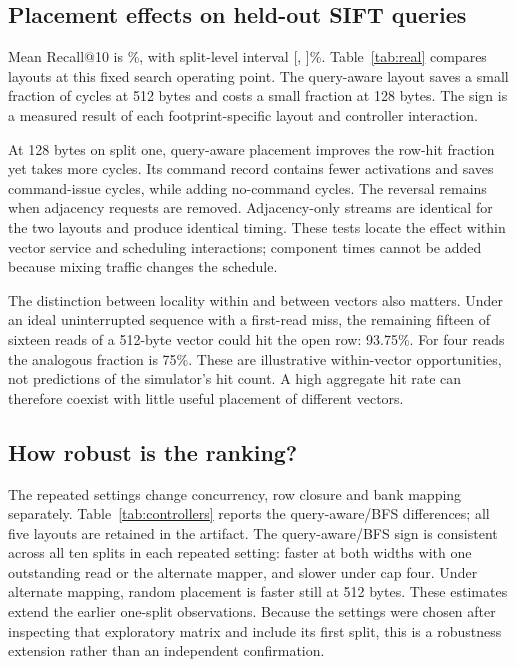 \documentclass[conference]{IEEEtran}
\begin{document}
\subsection{Placement effects on held-out SIFT queries}
Mean Recall@10 is \SiftRecall\%, with split-level interval [\SiftRecallLow, \SiftRecallHigh]\%. Table~\ref{tab:real} compares layouts at this fixed search operating point. The query-aware layout saves a small fraction of cycles at 512 bytes and costs a small fraction at 128 bytes. The sign is a measured result of each footprint-specific layout and controller interaction.

\begin{table}[htbp]\centering\small\setlength{\tabcolsep}{4pt}
\caption{Flat-replay mean cycle difference relative to BFS and paired 95\% interval over ten query splits. Negative is faster. The 128-byte case changes storage footprint while retaining float32 search.}\label{tab:real}

\end{table}

At 128 bytes on split one, query-aware placement improves the row-hit fraction yet takes \MixedDeltaCycles{} more cycles. Its command record contains \MixedSavedACT{} fewer activations and saves \MixedSavedCommands{} command-issue cycles, while adding \MixedExtraNoCommand{} no-command cycles. The reversal remains when adjacency requests are removed. Adjacency-only streams are identical for the two layouts and produce identical timing. These tests locate the effect within vector service and scheduling interactions; component times cannot be added because mixing traffic changes the schedule.

The distinction between locality within and between vectors also matters. Under an ideal uninterrupted sequence with a first-read miss, the remaining fifteen of sixteen reads of a 512-byte vector could hit the open row: 93.75\%. For four reads the analogous fraction is 75\%. These are illustrative within-vector opportunities, not predictions of the simulator's hit count. A high aggregate hit rate can therefore coexist with little useful placement of different vectors.

\subsection{How robust is the ranking?}
The repeated settings change concurrency, row closure and bank mapping separately. Table~\ref{tab:controllers} reports the query-aware/BFS differences; all five layouts are retained in the artifact. The query-aware/BFS sign is consistent across all ten splits in each repeated setting: faster at both widths with one outstanding read or the alternate mapper, and slower under cap four. Under alternate mapping, random placement is faster still at 512 bytes. These estimates extend the earlier one-split observations. Because the settings were chosen after inspecting that exploratory matrix and include its first split, this is a robustness extension rather than an independent confirmation.
\end{document}
